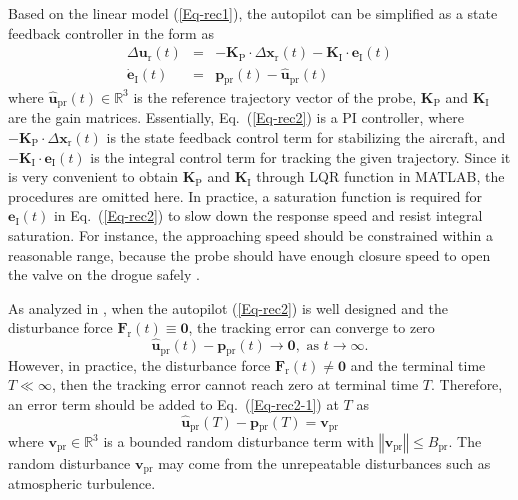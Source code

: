 Based on the linear model (\ref{Eq-rec1}), the autopilot can be simplified
as a state feedback controller \cite{lee2013estimation} in the form
as
\begin{eqnarray}
\Delta\boldsymbol{u}_{\text{r}}\left(t\right) & = & -\mathbf{K}_{\text{P}}\cdot\Delta{\mathbf{x}_{\text{r}}\left(t\right)}-\mathbf{K}_{\text{I}}\cdot\mathbf{e}_{\text{I}}\left(t\right)\label{Eq-rec2}\\
\mathbf{\dot{e}}_{\text{I}}\left(t\right) & = & \mathbf{p}{_{\text{pr}}\left(t\right)}-\mathbf{\hat{u}}_{\text{pr}}\left(t\right)\label{Eq-rec3}
\end{eqnarray}
where $\mathbf{\hat{u}}_{\text{pr}}\left(t\right)\in%
\mathbb{R}%
^{3}$ is the reference trajectory vector of the probe, $\mathbf{K}_{\text{P}}$
and $\mathbf{K}_{\text{I}}$ are the gain matrices. Essentially, Eq.~(\ref{Eq-rec2})
is a PI controller, where $-\mathbf{K}_{\text{P}}\cdot\Delta{\mathbf{x}_{\text{r}}}\left(t\right)$
is the state feedback control term for stabilizing the aircraft, and
${-}\mathbf{K}_{\text{I}}\cdot\mathbf{e}_{\text{I}}\left(t\right)$
is the integral control term for tracking the given trajectory. Since
it is very convenient to obtain $\mathbf{K}_{\text{P}}$ and $\mathbf{K}_{\text{I}}$
through LQR function in MATLAB, the procedures are omitted here. In
practice, a saturation function is required for $\mathbf{e}_{\text{I}}\left(t\right)$
in Eq.~(\ref{Eq-rec2}) to slow down the response speed and resist
integral saturation. For instance, the approaching speed should be
constrained within a reasonable range, because
the probe should have enough closure speed to open the valve on the
drogue safely \cite{Dibley-2007-2}.

As analyzed in \cite{lee2013estimation,AirContrl}, when the autopilot
(\ref{Eq-rec2}) is well designed and the disturbance force {$\mathbf{F}$}${_{\text{r}}\left(t\right)}\equiv\mathbf{0}$,
the tracking error can converge to zero
\begin{equation}
\mathbf{\hat{u}}_{\text{pr}}\left(t\right)-\mathbf{p}{_{\text{pr}}}\left(t\right)\rightarrow\mathbf{0},\text{ as }t\rightarrow\infty.\label{Eq-rec2-1}
\end{equation}
However, in practice, the disturbance force {$\mathbf{F}$}${_{\text{r}}\left(t\right)}\neq\mathbf{0}$
and the terminal time $T\ll\infty$, then the tracking error cannot
reach zero at terminal time $T$. Therefore, an error term should
be added to Eq.~(\ref{Eq-rec2-1}) at $T$ as
\begin{equation}
\mathbf{\hat{u}}_{\text{pr}}\left(T\right)-\mathbf{p}{_{\text{pr}}}\left(T\right)=\mathbf{v}_{\text{pr}}\label{Eq-rec5}
\end{equation}
where $\mathbf{v}_{\text{pr}}\in%
\mathbb{R}%
^{3}$ is a bounded random disturbance term with $\left\Vert \mathbf{v}_{\text{pr}}\right\Vert \leq B_{\text{pr}}$.
The random disturbance $\mathbf{v}_{\text{pr}}$ may come from the
unrepeatable disturbances such as atmospheric turbulence.

